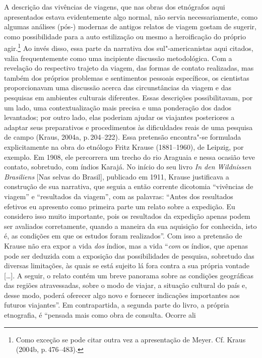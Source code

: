 A descrição das vivências de viagens, que nas obras dos etnógrafos aqui
apresentados estava evidentemente algo normal, não servia
necessariamente, como algumas análises (pós-) modernas de antigos
relatos de viagem gostam de sugerir, como possibilidade para a auto
estilização ou mesmo a heroificação do próprio agir.\footnote{Como
  exceção se pode citar outra vez a apresentação de Meyer. Cf. Kraus
  (2004b, p.\,476--483).} Ao invés disso, essa parte da narrativa dos
sul"-americanistas aqui citados, valia frequentemente como uma incipiente
discussão metodológica. Com a revelação do respectivo trajeto da viagem,
das formas de contato realizadas, mas também dos próprios problemas e
sentimentos pessoais específicos, os cientistas proporcionavam uma
discussão acerca das circunstâncias da viagem e das pesquisas em
ambientes culturais diferentes. Essas descrições possibilitavam, por um
lado, uma contextualização mais precisa e uma ponderação dos dados
levantados; por outro lado, elas poderiam ajudar os viajantes
posteriores a adaptar seus preparativos e procedimentos às dificuldades
reais de uma pesquisa de campo (Kraus, 2004a, p.\,204--222). Essa
pretensão encontra"-se formulada explicitamente na obra do etnólogo Fritz
Krause (1881--1960), de Leipzig, por exemplo. Em 1908, ele percorrera um
trecho do rio Araguaia e nessa ocasião teve contato, sobretudo, com
índios Karajá. No início do seu livro \textit{In den Wildnissen
Brasiliens} {[}Nas selvas do Brasil{]}, publicado em 1911, Krause
justificava a construção de sua narrativa, que seguia a então corrente
dicotomia ``vivências de viagem'' e ``resultados da viagem'', com as
palavras: ``Antes dos resultados efetivos eu apresento como primeira
parte um relato sobre a expedição. Eu considero isso muito importante,
pois os resultados da expedição apenas podem ser avaliados corretamente,
quando a maneira da sua aquisição for conhecida, isto é, as condições
em que os estudos foram realizados''. Com isso a pretensão de Krause não
era expor a vida \textit{dos} índios, mas a vida ``\textit{com} os índios,
que apenas pode ser deduzida com a exposição das possibilidades de
pesquisa, sobretudo das diversas limitações, às quais se está sujeito
lá fora contra a sua própria vontade {[}\ldots{}{]}. A seguir, o relato
contém um breve panorama sobre as condições geográficas das regiões
atravessadas, sobre o modo de viajar, a situação cultural do país e,
desse modo, poderá oferecer algo novo e fornecer indicações importantes
aos futuros viajantes''. Em contrapartida, a segunda parte do livro, a
própria etnografia, é ``pensada mais como obra de consulta. Ocorre ali
